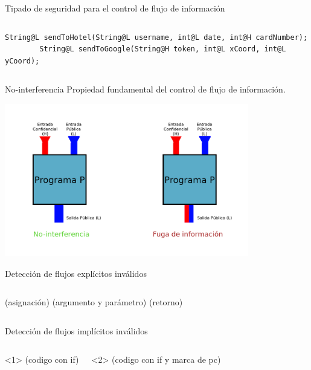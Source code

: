 \documentclass[aspectratio=169,10pt]{beamer}
\begin{document}
\begin{frame}[fragile]{Tipado de seguridad para el control de flujo de información}
\begin{columns}[T,onlytextwidth]
\begin{onlyenv}
\begin{lstlisting}[escapechar=?]
        String@L sendToHotel(String@L username, int@L date, int@H cardNumber);
        String@L sendToGoogle(String@H token, int@L xCoord, int@L yCoord);
      \end{lstlisting}
    \end{onlyenv}
  \end{columns}

\end{frame}

\begin{frame}[fragile]{No-interferencia}
  Propiedad fundamental del control de flujo de información.
	\begin{center}
		\includegraphics[width=0.8\textwidth]{images/noninterference.png}
	\end{center}
\end{frame}

\begin{frame}[fragile]{Detección de flujos explícitos inválidos}
	\begin{columns}[T,onlytextwidth]
		(asignación) \pause
		(argumento y parámetro) \pause
		(retorno)
	\end{columns}
\end{frame}

\begin{frame}[fragile]{Detección de flujos implícitos inválidos}
	\begin{columns}[T,onlytextwidth]
		\begin{onlyenv}<1>
			(codigo con if)
		\end{onlyenv}
		\begin{onlyenv}<2>
			(codigo con if y marca de pc)
		\end{onlyenv}

	\end{columns}
\end{frame}
\end{document}

